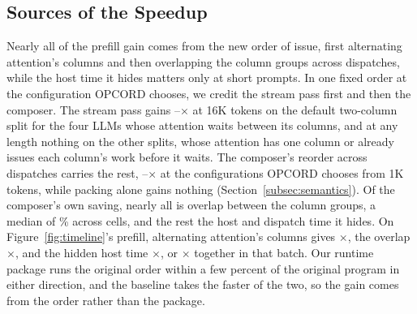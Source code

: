 \subsection{Sources of the Speedup}
\label{subsec:ablation}

Nearly all of the prefill gain comes from the new order of issue, first alternating attention's columns and then overlapping the column groups across dispatches, while the host time it hides matters only at short prompts.
In one fixed order at the configuration OPCORD chooses, we credit the stream pass first and then the composer.
The stream pass gains \StreamSTwoLo--\StreamSTwoHi$\times$ at 16K tokens on the default two-column split for the four LLMs whose attention waits between its columns, and at any length nothing on the other splits, whose attention has one column or already issues each column's work before it waits.
The composer's reorder across dispatches carries the rest, \ComposerShareLo--\ComposerShareHi$\times$ at the configurations OPCORD chooses from 1K tokens, while packing alone gains nothing (Section~\ref{subsec:semantics}).
Of the composer's own saving, nearly all is overlap between the column groups, a median of \DecompOverlapShare\% across cells, and the rest the host and dispatch time it hides.
On Figure~\ref{fig:timeline}'s prefill, alternating attention's columns gives \DecompAlt$\times$, the overlap \DecompOverlap$\times$, and the hidden host time \DecompHost$\times$, or \DecompTotal$\times$ together in that batch.
Our runtime package runs the original order within a few percent of the original program in either direction, and the baseline takes the faster of the two, so the gain comes from the order rather than the package.

